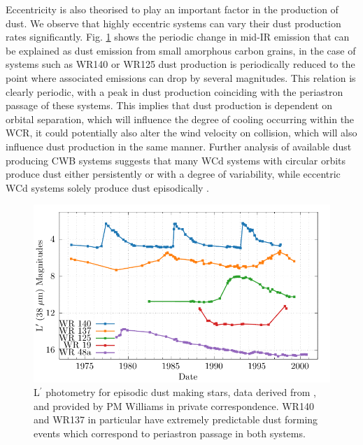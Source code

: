Eccentricity is also theorised to play an important factor in the production of dust.
We observe that highly eccentric systems can vary their dust production rates significantly.
Fig. \ref{fig:periodicmags} shows the periodic change in mid-IR emission that can be explained as dust emission from small amorphous carbon grains, in the case of systems such as WR140 or WR125 dust production is periodically reduced to the point where associated emissions can drop by several magnitudes.
This relation is clearly periodic, with a peak in dust production coinciding with the periastron passage of these systems.
This implies that dust production is dependent on orbital separation, which will influence the degree of cooling occurring within the WCR, it could potentially also alter the wind velocity on collision, which will also influence dust production in the same manner.
Further analysis of available dust producing CWB systems suggests that many WCd systems with circular orbits produce dust either persistently or with a degree of variability, while eccentric WCd systems solely produce dust episodically \parencite{crowther_dust_2003,williamsVariableDustEmission2019}.

\begin{figure}[h]
  \centering
  \includegraphics[]{assets/magnitudes/magnitudes.pdf}
  \caption[L$^\prime$ photometry of episodic dust making stars]{L$^\prime$ photometry for episodic dust making stars, data derived from \textcite{crowther_dust_2003}, and provided by PM Williams in private correspondence. WR140 and WR137 in particular have extremely predictable dust forming events which correspond to periastron passage in both systems.}
  \label{fig:periodicmags}
\end{figure}


